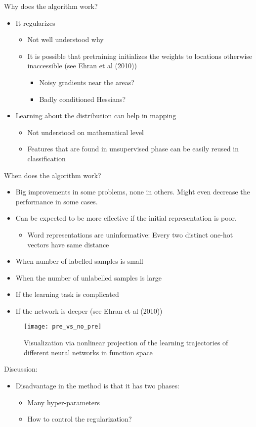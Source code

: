 \begin{frame}
Why does the algorithm work?
\begin{itemize}
\item It regularizes
\begin{itemize}
\item Not well understood why
\item It is possible that pretraining initializes the weights to locations otherwise inaccessible (see Ehran et al (2010))
\begin{itemize}
\item Noisy gradients near the areas?
\item Badly conditioned Hessians?
\end{itemize}
\end{itemize}
\item Learning about the distribution can help in mapping 
\begin{itemize}
\item Not understood on mathematical level
\item Features that are found in unsupervised phase can be easily reused in classification
\end{itemize}
\end{itemize}
\end{frame}

\begin{frame}
When does the algorithm work?
\begin{itemize}
\item Big improvements in some problems, none in others. Might even decrease the performance in some cases.
\item Can be expected to be more effective if the initial representation is poor.
\begin{itemize}
\item Word representations are uninformative: Every two distinct one-hot vectors have same distance 
\end{itemize}
\item When number of labelled samples is small
\item When the number of unlabelled samples is large
\item If the learning task is complicated
\item If the network is deeper (see Ehran et al (2010))
\end{itemize}
\end{frame}


\begin{frame}
\begin{figure}[t]
\centering
\texttt{[image: pre\_vs\_no\_pre]} %
\caption{Visualization via nonlinear projection of the learning trajectories of different
neural networks in function space}
\end{figure}
\end{frame}


\begin{frame}
Discussion:
\begin{itemize}
\item Disadvantage in the method is that it has two phases:
\begin{itemize}
\item Many hyper-parameters
\item How to control the regularization?
\end{itemize}
\end{itemize}
\end{frame}
